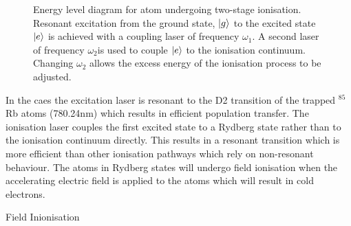 \begin{figure}
\centering
{}
\caption[Title]{Energy level diagram for atom undergoing two-stage ionisation. Resonant excitation from the ground state, $\ket{g}$ to the excited state $\ket{e}$ is achieved with a coupling laser of frequency $\omega_1$. A second laser of frequency $\omega_2$is used to couple $\ket{e}$ to the ionisation continuum. Changing $\omega_2$ allows the excess energy of the ionisation process to be adjusted.}
\label{fig:energy_level}
\end{figure}

In the \gls{caes} the excitation laser is resonant to the D2 transition of the trapped $^{85}$Rb atoms (780.24nm) which results in efficient population transfer. The ionisation laser couples the first excited state to a Rydberg state rather than to the ionisation continuum directly. This results in a resonant transition which is more efficient than other ionisation pathways which rely on non-resonant behaviour. The atoms in Rydberg states will undergo field ionisation when the accelerating electric field is applied to the atoms which will result in cold electrons.

{\color{red} Field Inionisation}

